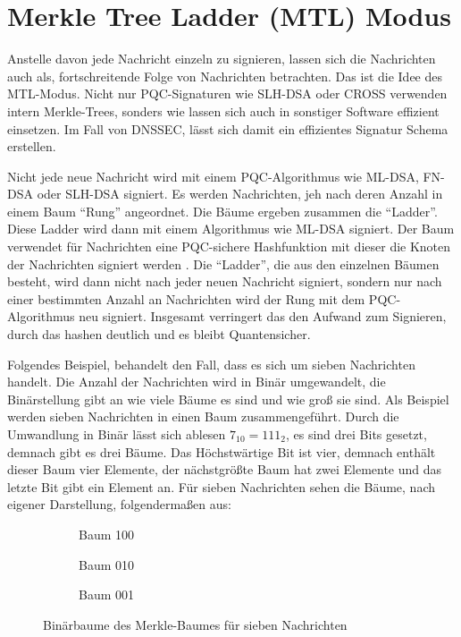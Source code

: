 \chapter{Merkle Tree Ladder (MTL) Modus}
\label{section-merkle-tree-ladder}
Anstelle davon jede Nachricht einzeln zu signieren, lassen sich die Nachrichten auch als, fortschreitende Folge von Nachrichten betrachten.
Das ist die Idee des MTL-Modus.
Nicht nur PQC-Signaturen wie SLH-DSA oder CROSS verwenden intern Merkle-Trees, sonders wie lassen sich auch in sonstiger Software effizient einsetzen.
Im Fall von DNSSEC, lässt sich damit ein effizientes Signatur Schema erstellen.

Nicht jede neue Nachricht wird mit einem PQC-Algorithmus wie ML-DSA, FN-DSA oder SLH-DSA signiert.
Es werden Nachrichten, jeh nach deren Anzahl in einem Baum \enquote{Rung} angeordnet. Die Bäume ergeben zusammen die \enquote{Ladder}. Diese Ladder wird dann mit einem Algorithmus wie ML-DSA signiert.
Der Baum verwendet für Nachrichten eine PQC-sichere Hashfunktion mit dieser die Knoten der Nachrichten signiert werden \cite{freglyMerkleTreeLadder2023}.
Die \enquote{Ladder}, die aus den einzelnen Bäumen besteht, wird dann nicht nach jeder neuen Nachricht signiert, sondern nur nach einer bestimmten Anzahl an Nachrichten wird der Rung mit dem PQC-Algorithmus neu signiert.
Insgesamt verringert das den Aufwand zum Signieren, durch das hashen deutlich und es bleibt Quantensicher.

Folgendes Beispiel, behandelt den Fall, dass es sich um sieben Nachrichten handelt.
Die Anzahl der Nachrichten wird in Binär umgewandelt, die Binärstellung gibt an wie viele Bäume es sind und wie groß sie sind.
Als Beispiel werden sieben Nachrichten in einen Baum zusammengeführt. Durch die Umwandlung in Binär lässt sich ablesen $7_{10} = 111_{2}$, es sind drei Bits gesetzt,
demnach gibt es drei Bäume. Das Höchstwärtige Bit ist vier, demnach enthält dieser Baum vier Elemente, der nächstgrößte Baum hat zwei Elemente und das letzte Bit gibt ein Element an.
Für sieben Nachrichten sehen die Bäume, nach eigener Darstellung, folgendermaßen aus:

\begin{figure}[htbp]
    \begin{subfigure}[b]{0.3\textwidth}
        \centering
        \siebenErsterBaum
        \caption{Baum 100}
    \label{fig:baum}
    \end{subfigure}
    \hfill
    \begin{subfigure}[b]{0.3\textwidth}
        \centering
        \siebenZweiterBaum
        \caption{Baum 010}
        \label{fig:secondBaum}
    \end{subfigure}
    \hfill
    \begin{subfigure}[b]{0.3\textwidth}
        \centering
        \siebenDritterBaum
        \caption{Baum 001}
        \label{fig:thirdTree}
    \end{subfigure}
    \caption{Binärbaume des Merkle-Baumes für sieben Nachrichten}
    \label{fig:merkle-tree}
\end{figure}

